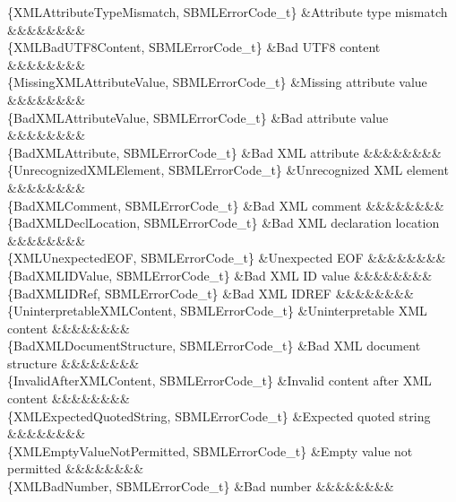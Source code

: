 \begin{DoxyParagraph}{}
\begin{longtabu}
\{X\+M\+L\+Attribute\+Type\+Mismatch, S\+B\+M\+L\+Error\+Code\+\_\+t\} &Attribute type mismatch &&&&&&&&\\
\{X\+M\+L\+Bad\+U\+T\+F8\+Content, S\+B\+M\+L\+Error\+Code\+\_\+t\} &Bad U\+T\+F8 content &&&&&&&&\\
\{Missing\+X\+M\+L\+Attribute\+Value, S\+B\+M\+L\+Error\+Code\+\_\+t\} &Missing attribute value &&&&&&&&\\
\{Bad\+X\+M\+L\+Attribute\+Value, S\+B\+M\+L\+Error\+Code\+\_\+t\} &Bad attribute value &&&&&&&&\\
\{Bad\+X\+M\+L\+Attribute, S\+B\+M\+L\+Error\+Code\+\_\+t\} &Bad X\+ML attribute &&&&&&&&\\
\{Unrecognized\+X\+M\+L\+Element, S\+B\+M\+L\+Error\+Code\+\_\+t\} &Unrecognized X\+ML element &&&&&&&&\\
\{Bad\+X\+M\+L\+Comment, S\+B\+M\+L\+Error\+Code\+\_\+t\} &Bad X\+ML comment &&&&&&&&\\
\{Bad\+X\+M\+L\+Decl\+Location, S\+B\+M\+L\+Error\+Code\+\_\+t\} &Bad X\+ML declaration location &&&&&&&&\\
\{X\+M\+L\+Unexpected\+E\+OF, S\+B\+M\+L\+Error\+Code\+\_\+t\} &Unexpected E\+OF &&&&&&&&\\
\{Bad\+X\+M\+L\+I\+D\+Value, S\+B\+M\+L\+Error\+Code\+\_\+t\} &Bad X\+ML ID value &&&&&&&&\\
\{Bad\+X\+M\+L\+I\+D\+Ref, S\+B\+M\+L\+Error\+Code\+\_\+t\} &Bad X\+ML I\+D\+R\+EF &&&&&&&&\\
\{Uninterpretable\+X\+M\+L\+Content, S\+B\+M\+L\+Error\+Code\+\_\+t\} &Uninterpretable X\+ML content &&&&&&&&\\
\{Bad\+X\+M\+L\+Document\+Structure, S\+B\+M\+L\+Error\+Code\+\_\+t\} &Bad X\+ML document structure &&&&&&&&\\
\{Invalid\+After\+X\+M\+L\+Content, S\+B\+M\+L\+Error\+Code\+\_\+t\} &Invalid content after X\+ML content &&&&&&&&\\
\{X\+M\+L\+Expected\+Quoted\+String, S\+B\+M\+L\+Error\+Code\+\_\+t\} &Expected quoted string &&&&&&&&\\
\{X\+M\+L\+Empty\+Value\+Not\+Permitted, S\+B\+M\+L\+Error\+Code\+\_\+t\} &Empty value not permitted &&&&&&&&\\
\{X\+M\+L\+Bad\+Number, S\+B\+M\+L\+Error\+Code\+\_\+t\} &Bad number &&&&&&&&\\

\end{longtabu}
\end{DoxyParagraph}
